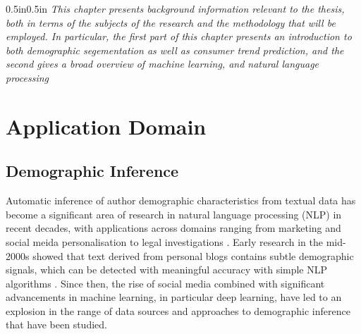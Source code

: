 \documentclass{report}
\begin{document}
\begin{adjustwidth}{0.5in}{0.5in}
\textit{This chapter presents background information relevant to the thesis, both in terms of the subjects of the research and the methodology that will be employed. In particular, the first part of this chapter presents an introduction to both demographic segementation as well as consumer trend prediction, and the second gives a broad overview of machine learning, and natural language processing}
\end{adjustwidth}

\section{Application Domain}

\subsection{Demographic Inference}

Automatic inference of author demographic characteristics from textual data has become a significant area of research in natural language processing (NLP) in recent decades, with applications across domains ranging from marketing and social meida personalisation to legal investigations \cite{burger-etal-2011-discriminating}. Early research in the mid-2000s showed that text derived from personal blogs contains subtle demographic signals, which can be detected with meaningful accuracy with simple NLP algorithms \cite{blog-authorship-corpus}. Since then, the rise of social media combined with significant advancements in machine learning, in particular deep learning, have led to an explosion in the range of data sources and approaches to demographic inference that have been studied.
\end{document}
